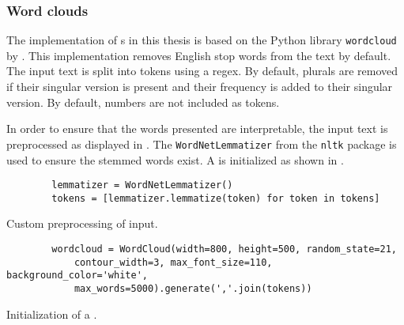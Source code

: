 \subsubsection*{Word clouds}\label{subsubsec:impl-wordcloud}

The implementation of \wordcloud{}s in this thesis is based on the Python library \texttt{wordcloud} by \citeauthor{wordcloud-dev} \cite{wordcloud-dev}.
This implementation removes English stop words from the text by default.
The input text is split into tokens using a regex.
By default, plurals are removed if their singular version is present and their frequency is added to their singular version.
By default, numbers are not included as tokens.

In order to ensure that the words presented are interpretable, the input text is preprocessed as displayed in .
The \texttt{WordNetLemmatizer} from the \texttt{nltk} package is used to ensure the stemmed words exist.
A \wordcloud{} is initialized as shown in .

\begin{listing}[htp]
    \begin{verbatim}
        lemmatizer = WordNetLemmatizer()
        tokens = [lemmatizer.lemmatize(token) for token in tokens]
    \end{verbatim}
    \caption[Custom preprocessing of \wordcloud{} input]
    {Custom preprocessing of \wordcloud{} input.
    }
    \label{lst:impl-preproc-wordcloud}
\end{listing}

\begin{listing}[htp]
    \begin{verbatim}
        wordcloud = WordCloud(width=800, height=500, random_state=21, 
            contour_width=3, max_font_size=110, background_color='white', 
            max_words=5000).generate(','.join(tokens))
    \end{verbatim}
    \caption[Initialization of a \wordcloud{}]
    {Initialization of a \wordcloud{}.
    }
    \label{lst:impl-wordcloud}
\end{listing}

